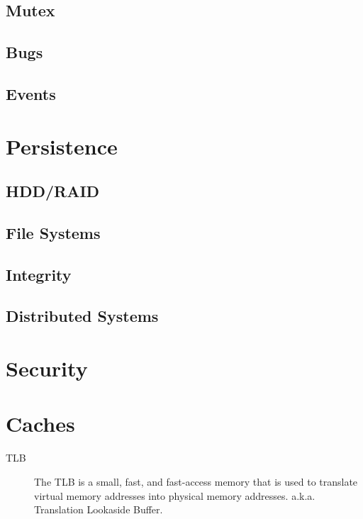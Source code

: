 \documentclass{article}
\begin{document}
\subsection{Mutex}
\subsection{Bugs}
\subsection{Events}
\section{Persistence}
\subsection{HDD/RAID}
\subsection{File Systems}
\subsection{Integrity}
\subsection{Distributed Systems}
\section{Security}
\section{Caches}
\begin{description}
	\item[TLB]
	      The TLB is a small, fast, and fast-access memory that is used to translate virtual memory addresses into physical memory addresses. a.k.a. Translation Lookaside Buffer.
\end{description}
\end{document}
